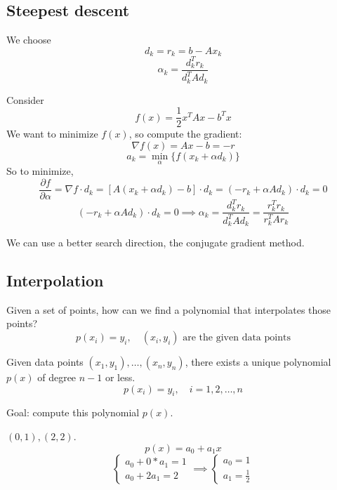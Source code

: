 \documentclass[11pt]{article}
\begin{document}
\subsection{Steepest descent}
We choose
\[
    d_k = r_k = b-Ax_k
\]
\[
    \alpha_k = \frac{d_k^T r_k}{d_k^TAd_k}
\]

Consider
\[
    f(x) = \frac{1}{2}x^TAx-b^Tx
\]
We want to minimize $f(x)$, so compute the gradient:
\[
    \nabla f(x) = Ax-b = -r
\]
\[
    a_k = \min_\alpha\{f(x_k + \alpha d_k)\}
\]
So to minimize,
\[
    \frac{\partial f}{\partial \alpha} = \nabla f \cdot d_k=[A(x_k+\alpha d_k)-b] \cdot d_k = (-r_k + \alpha A d_k) \cdot d_k = 0 
\]
\[
    (-r_k+\alpha A d_k) \cdot d_k = 0 \implies \alpha_k = \frac{d_k^T r_k}{d_k^TAd_k} = \frac{r^T_k r_k }{r_k^T A r_k}
\]

\begin{remark}
    We can use a better search direction, the conjugate gradient method.
\end{remark}


\subsection{Interpolation}
Given a set of points, how can we find a polynomial that interpolates those points?
\[
    p(x_i ) = y_i, \quad (x_i, y_i) \text{ are the given data points}
\]
\begin{theorem}
    Given data points $(x_1, y_1), \dots, (x_n, y_n)$, there exists a unique polynomial $p(x)$ of degree $n-1$ or less.
    \[
        p(x_i) = y_i, \quad i = 1,2,\dots, n
    \]
    
\end{theorem}

Goal: compute this polynomial $p(x)$.
\begin{example}
    $(0,1), (2,2)$. 
    \[
        p(x) = a_0 + a_1x
    \]
    \[
    \begin{cases}
        a_0 + 0*a_1 = 1\\
        a_0 + 2a_1 = 2
    \end{cases}
    \implies
    \begin{cases}
        a_0 = 1 \\
        a_1 = \frac{1}{2}
    \end{cases}
    \]
    
\end{example}
\end{document}
